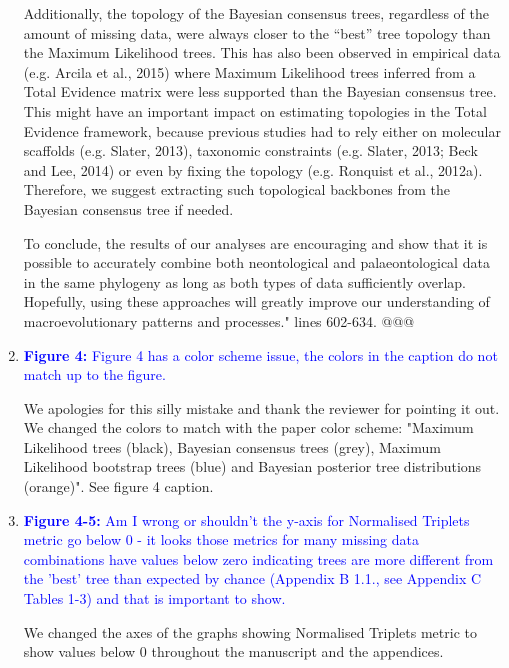 \documentclass[12pt,letterpaper]{article}
\begin{document}
\begin{enumerate}
Additionally, the topology of the Bayesian consensus trees, regardless of the amount of missing data, were always closer to the ``best'' tree topology than the Maximum Likelihood trees.
This has also been observed in empirical data (e.g. Arcila et al., 2015) where Maximum Likelihood trees inferred from a Total Evidence matrix were less supported than the Bayesian consensus tree.
This might have an important impact on estimating topologies in the Total Evidence framework, because previous studies had to rely either on molecular scaffolds (e.g. Slater, 2013), taxonomic constraints (e.g. Slater, 2013; Beck and Lee, 2014) or even by fixing the topology (e.g. Ronquist et al., 2012a).
Therefore, we suggest extracting such topological backbones from the Bayesian consensus tree if needed.

To conclude, the results of our analyses are encouraging and show that it is possible to accurately combine both neontological and palaeontological data in the same phylogeny as long as both types of data sufficiently overlap.
Hopefully, using these approaches will greatly improve our understanding of macroevolutionary patterns and processes." lines 602-634. @@@


\item{\textcolor{blue}{\textbf{Figure 4:} Figure 4 has a color scheme issue, the colors in the caption do not match up to the figure.}}

We apologies for this silly mistake and thank the reviewer for pointing it out. We changed the colors to match with the paper color scheme: "Maximum Likelihood trees (black), Bayesian consensus trees (grey), Maximum Likelihood bootstrap trees (blue) and Bayesian posterior tree distributions (orange)". See figure 4 caption.


\item{\textcolor{blue}{\textbf{Figure 4-5:} Am I wrong or shouldn't the y-axis for Normalised Triplets metric go below 0 - it looks those metrics for many missing data combinations have values below zero indicating trees are more different from the 'best' tree than expected by chance (Appendix B 1.1., see Appendix C Tables 1-3) and that is important to show.}}

We changed the axes of the graphs showing Normalised Triplets metric to show values below 0 throughout the manuscript and the appendices.



\end{enumerate}
\end{document}
